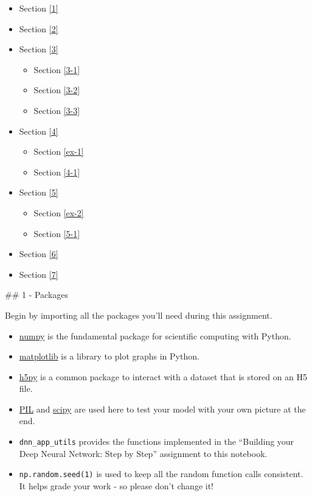 \documentclass[11pt]{article}
\providecommand{\tightlist}{%
      \setlength{\itemsep}{0pt}\setlength{\parskip}{0pt}}
\begin{document}
\begin{itemize}
\tightlist
\item
  Section \ref{1}
\item
  Section \ref{2}
\item
  Section \ref{3}

  \begin{itemize}
  \tightlist
  \item
    Section \ref{3-1}
  \item
    Section \ref{3-2}
  \item
    Section \ref{3-3}
  \end{itemize}
\item
  Section \ref{4}

  \begin{itemize}
  \tightlist
  \item
    Section \ref{ex-1}
  \item
    Section \ref{4-1}
  \end{itemize}
\item
  Section \ref{5}

  \begin{itemize}
  \tightlist
  \item
    Section \ref{ex-2}
  \item
    Section \ref{5-1}
  \end{itemize}
\item
  Section \ref{6}
\item
  Section \ref{7}
\end{itemize}

    \#\# 1 - Packages

    Begin by importing all the packages you'll need during this assignment.

\begin{itemize}
\tightlist
\item
  \href{https://www.numpy.org/}{numpy} is the fundamental package for
  scientific computing with Python.
\item
  \href{http://matplotlib.org}{matplotlib} is a library to plot graphs
  in Python.
\item
  \href{http://www.h5py.org}{h5py} is a common package to interact with
  a dataset that is stored on an H5 file.
\item
  \href{http://www.pythonware.com/products/pil/}{PIL} and
  \href{https://www.scipy.org/}{scipy} are used here to test your model
  with your own picture at the end.
\item
  \texttt{dnn\_app\_utils} provides the functions implemented in the
  ``Building your Deep Neural Network: Step by Step'' assignment to this
  notebook.
\item
  \texttt{np.random.seed(1)} is used to keep all the random function
  calls consistent. It helps grade your work - so please don't change
  it!
\end{itemize}
\end{document}
